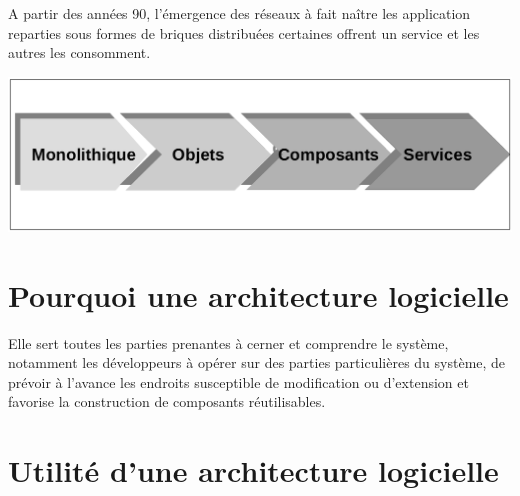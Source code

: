 \documentclass[12pt, a4paper, openany]{report}
\begin{document}
 A partir des années 90, l’émergence des réseaux à fait naître les application reparties sous formes de briques distribuées certaines offrent un service et les autres les consomment.

   \begin{center}
     \includegraphics[scale=0.35]{evolution_archi_7.png}
     \label{fig7}
   \end{center}
   
 \section{Pourquoi une architecture logicielle}
 Elle sert toutes les parties prenantes à cerner et comprendre le système, notamment les  développeurs à opérer sur des parties particulières du système, de prévoir à l’avance les endroits susceptible de modification ou d’extension et favorise la construction de composants réutilisables.
 
 \section{Utilité d’une architecture logicielle} \cite{refbib3}
 
\end{document}

